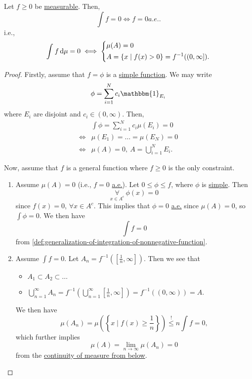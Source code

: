 \begin{proposition}
	Let \(f\geq 0\) be \hyperref[def:measurable-function]{measurable}. Then,
	\[
		\int f = 0 \iff f = 0 \hyperref[def:mu-almost-everywhere]{ a.e.}.
	\]
	i.e.,
	\[
		\int_{}^{} f \,\mathrm{d}\mu = 0 \iff \begin{dcases}
			\mu (A) = 0 \\
			A       = \left\{x \mid f(x)>0\right\} = f^{-1} ((0, \infty ]).
		\end{dcases}
	\]
\end{proposition}
\begin{proof}
	Firstly, assume that \(f = \phi \) is a \hyperref[def:simple-function]{simple function}. We may write
	\[
		\phi = \sum\limits_{i=1}^{N} c_{i}\mathbbm{1}_{E_{i}}
	\]
	where \(E_{i}\) are disjoint and \(c_{i}\in(0, \infty )\). Then,
	\[
		\begin{split}
			&\int \phi = \sum\limits_{i=1}^{N} c_{i}\mu (E_{i}) = 0\\
			\iff& \mu (E_1) = \ldots = \mu (E_{N}) = 0\\
			\iff& \mu (A) = 0,\ A = \bigcup\limits_{i=1}^{N} E_{i}.
		\end{split}
	\]

	\par Now, assume that \(f\) is a general function where \(f\geq 0\) is the only constraint.
	\begin{enumerate}
		\item Assume \(\mu (A) = 0\) (i.e., \(f = 0\) \hyperref[def:mu-almost-everywhere]{a.e.}). Let \(0\leq \phi \leq f\), where \(\phi\) is \hyperref[def:simple-function]{simple}. Then
		      \[
			      \underset{x\in A^{c} }{\forall }\ \phi (x) = 0
		      \]
		      since \(f(x) = 0\), \(\forall x\in A^{c} \). This implies that \(\phi = 0\) \hyperref[def:mu-almost-everywhere]{a.e.} since \(\mu (A) = 0\), so \(\int \phi =0\). We then have
		      \[
			      \int f = 0
		      \]
		      from \autoref{def:generalization-of-integration-of-nonnegative-function}.
		\item Assume \(\int f = 0\). Let \(A_{n} = f^{-1} \left(\left[\frac{1}{n}, \infty \right]\right)\). Then we see that
		      \begin{itemize}
			      \item \(A_1\subset A_2\subset \ldots  \)
			      \item \(\bigcup\limits_{n=1}^{\infty} A_{n} = f^{-1} \left(\bigcup\limits_{n=1}^{\infty} \left[\frac{1}{n}, \infty \right]\right) = f^{-1} ((0, \infty )) = A\).
		      \end{itemize}
		      We then have
		      \[
			      \mu (A_{n}) = \mu \left(\left\{x \mid f(x)\geq \frac{1}{n}\right\}\right) \overset{\hyperref[lma:Markov-inequality]{!}}{\leq }n \int f = 0,
		      \]
		      which further implies
		      \[
			      \mu (A) = \lim\limits_{n \to \infty} \mu (A_{n}) = 0
		      \]
		      from the \hyperref[thm:measure-space-continuity-from-below]{continuity of measure from below}.
	\end{enumerate}
\end{proof}

